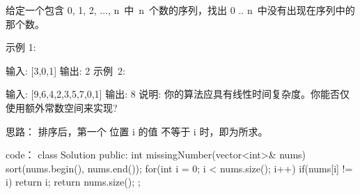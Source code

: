 给定一个包含 0, 1, 2, ..., n 中 n 个数的序列，找出 0 .. n 中没有出现在序列中的那个数。

示例 1:

输入: [3,0,1]
输出: 2
示例 2:

输入: [9,6,4,2,3,5,7,0,1]
输出: 8
说明:
你的算法应具有线性时间复杂度。你能否仅使用额外常数空间来实现?


















思路：
排序后，第一个 位置 i 的值 不等于 i 时，即为所求。





















code：
class Solution {
public:
    int missingNumber(vector<int>& nums) {
        sort(nums.begin(), nums.end());
        for(int i = 0; i < nums.size(); i++)
        {
            if(nums[i] != i) return i;
        }
        return nums.size();
    }
};